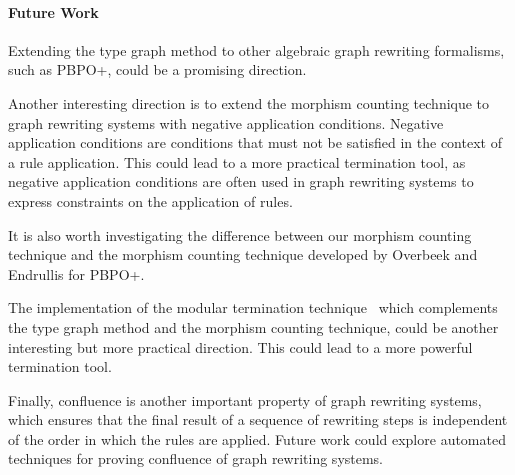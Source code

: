 \documentclass{report}
\begin{document}
 
\paragraph{Future Work}

Extending the type graph method to other algebraic graph rewriting formalisms, such as PBPO+, could be a promising direction.

Another interesting direction is to extend the morphism counting technique to graph rewriting systems with negative application conditions. Negative application conditions are conditions that must not be satisfied in the context of a rule application. This could lead to a more practical termination tool, as negative application conditions are often used in graph rewriting systems to express constraints on the application of rules.

It is also worth investigating the difference between our morphism counting technique and
 the morphism counting technique developed by Overbeek and Endrullis for PBPO+. 
 
The implementation of the modular termination technique~\cite{plump2018modular} which complements the type graph method and the morphism counting technique, could be another interesting but more practical direction. This could lead to a more powerful termination tool.
  
Finally, confluence is another important property of graph rewriting systems, which ensures that the final result of a sequence of rewriting steps is independent of the order in which the rules are applied. Future work could explore automated techniques for proving confluence of graph rewriting systems.

\printbibliography
\end{document}
